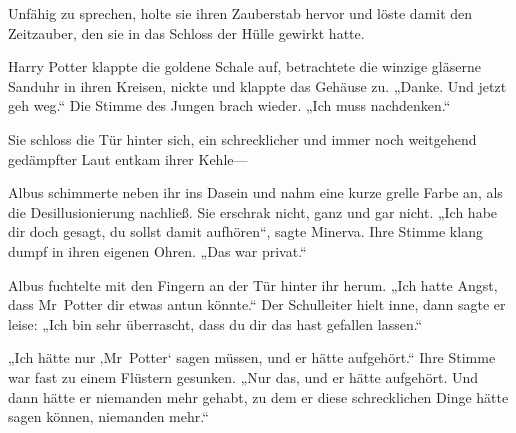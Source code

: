 Unfähig zu sprechen, holte sie ihren Zauberstab hervor und löste damit den Zeitzauber, den sie in das Schloss der Hülle gewirkt hatte.

Harry Potter klappte die goldene Schale auf, betrachtete die winzige gläserne Sanduhr in ihren Kreisen, nickte und klappte das Gehäuse zu. „Danke. Und jetzt geh weg.“ Die Stimme des Jungen brach wieder. „Ich muss nachdenken.“

\later

Sie schloss die Tür hinter sich, ein schrecklicher und immer noch weitgehend gedämpfter Laut entkam ihrer Kehle—


Albus schimmerte neben ihr ins Dasein und nahm eine kurze grelle Farbe an, als die Desillusionierung nachließ. Sie erschrak nicht, ganz und gar nicht. „Ich habe dir doch gesagt, du sollst damit aufhören“, sagte Minerva. Ihre Stimme klang dumpf in ihren eigenen Ohren. „Das war privat.“

Albus fuchtelte mit den Fingern an der Tür hinter ihr herum. „Ich hatte Angst, dass Mr~Potter dir etwas antun könnte.“ Der Schulleiter hielt inne, dann sagte er leise: „Ich bin sehr überrascht, dass du dir das hast gefallen lassen.“

„Ich hätte nur ‚Mr~Potter‘ sagen müssen, und er hätte aufgehört.“
Ihre Stimme war fast zu einem Flüstern gesunken.
„Nur das, und er hätte aufgehört. Und dann hätte er niemanden mehr gehabt, zu dem er diese schrecklichen Dinge hätte sagen können, niemanden mehr.“

